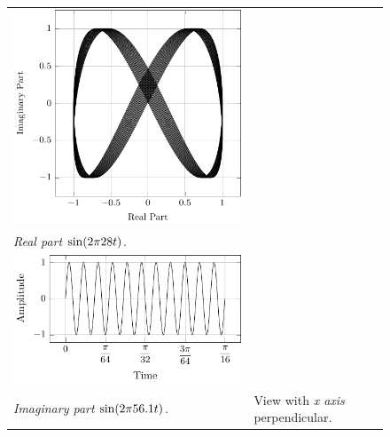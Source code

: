 \documentclass[../../course]{subfiles}
\begin{document}
\begin{figure} [H]
\begin{NiceTabularX} {\textwidth} {
            *{2}{>{\centering\arraybackslash}X}
        }
         {
             {
                \includegraphics[height = \textheight] {tikzpics/plotFrontViewComplexC.pdf}
            }
        }

        \\

         {\emph{Real part} $\sin(2 \pi 28 t)$.}
        \label{plt:realCmplxC}

        &
        \\

         {
             {
                \includegraphics[height = \textheight] {tikzpics/plotShortX3.pdf}
            }
        }

        &
        \\

         {\emph{Imaginary part} $\sin(2 \pi 56.1 t)$.}
        \label{plt:imagCmplxC}

        &

         {View with \emph{x axis} perpendicular.}
        \label{plt:frontViewCmplxC}

        \\

    \end{NiceTabularX}

\end{figure}
\end{document}
